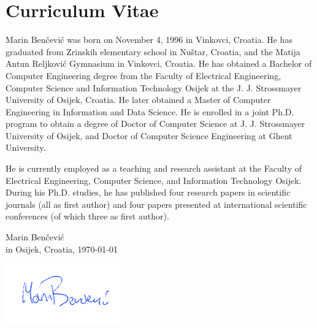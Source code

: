 \documentclass[
  11pt, %
  oneside, %
  english, %
  singlespacing, %
  liststotoc, %
  headsepline, %
  chapterinoneline, %
]{MastersDoctoralThesis} %
\begin{document}
\begin{refsection}

\printbibliography[heading=subbibintoc]
\end{refsection}

\begin{refsection}

\printbibliography[heading=subbibintoc]
\end{refsection}






\pagestyle{plain}
\chapter{Curriculum Vitae}

Marin Benčević was born on November 4, 1996 in Vinkovci, Croatia. He has graduated from Zrinskih elementary school in Nuštar, Croatia, and the Matija Antun Reljković Gymnasium in Vinkovci, Croatia. He has obtained a Bachelor of Computer Engineering degree from the Faculty of Electrical Engineering, Computer Science and Information Technology Osijek at the J. J. Strossmayer University of Osijek, Croatia. He later obtained a Master of Computer Engineering in Information and Data Science. He is enrolled in a joint Ph.D. program to obtain a degree of Doctor of Computer Science at J. J. Strossmayer University of Osijek, and Doctor of Computer Science Engineering at Ghent University.

He is currently employed as a teaching and research assistant at the Faculty of Electrical Engineering, Computer Science, and Information Technology Osijek. During his Ph.D. studies, he has published four research papers in scientific journals (all as first author) and four papers presented at international scientific conferences (of which three as first author).

\vspace{3cm}

\begin{flushright}
Marin Benčević\\
in Osijek, Croatia, \today

\includegraphics[width=5cm]{images/signature.png}
\end{flushright}
\end{document}
